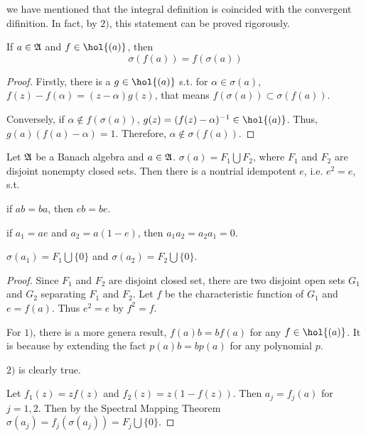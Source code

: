 \begin{rem}
	we have mentioned that the integral definition is coincided with the convergent difinition. In fact, by $2)$, this statement can be proved rigorously.
\end{rem}

\begin{thm}
	If $a \in \mathfrak{A}$ and $f \in \hol{(a)}$, then
	\begin{equation*}
		\sigma(f(a)) = f(\sigma(a))
	\end{equation*}
\end{thm}
\begin{proof}
	Firstly, there is a $g \in \hol{(a)}$ s.t. for $\alpha \in \sigma(a)$, $f(z)-f(\alpha) = (z-\alpha)g(z)$, that means $f(\sigma(a)) \subset \sigma(f(a))$.
	\item Conversely, if $\alpha \notin f(\sigma(a))$, $g(z)=(f(z)-\alpha)^{-1} \in \hol{(a)}$. Thus, $g(a)(f(a)-\alpha) = 1$. Therefore, $\alpha \notin \sigma(f(a))$.
\end{proof}

\begin{prop}
	Let $\mathfrak{A}$ be a Banach algebra and $a \in \mathfrak{A}$. $\sigma(a) = F_1 \bigcup F_2$, where $F_1$ and $F_2$ are disjoint nonempty closed sets. Then there is a nontrial idempotent $e$, i.e. $e^{2}=e$, s.t.
	\begin{enumerata}[label=\arabic*)]
		\item if $ab=ba$, then $eb=be$.
		\item if $a_1=ae$ and $a_2=a(1-e)$, then $a_1a_2=a_2a_1=0$.
		\item $\sigma(a_1)=F_1 \bigcup \{0\}$ and $\sigma(a_2)=F_2 \bigcup \{0\}$.
	\end{enumerata}
\end{prop}
\begin{proof}
	Since $F_1$ and $F_2$ are disjoint closed set, there are two disjoint open sets $G_1$ and $G_2$ separating $F_1$ and $F_2$. Let $f$ be the characteristic function of $G_1$ and $e=f(a)$. Thus $e^{2}=e$ by $f^{2}=f$.
	\item For $1)$, there is a more genera result, $f(a)b=bf(a)$ for any $f \in \hol{(a)}$. It is because by extending the fact $p(a)b=bp(a)$ for any polynomial $p$.
	\item $2)$ is clearly true.
	\item Let $f_1(z)=zf(z)$ and $f_2(z)=z(1-f(z))$. Then $a_j = f_j(a)$ for $j=1,2$. Then by the Spectral Mapping Theorem $\sigma(a_j) = f_j(\sigma(a_j)) = F_j \bigcup \{0\}$.
\end{proof}

